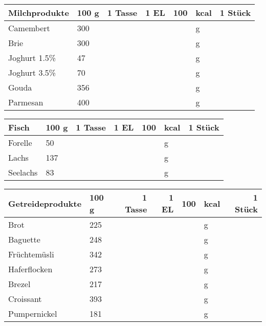 \vfill

\begin{tabularx}{\linewidth}{X|l|r|r|rl|r}
Milchprodukte     &   100 g & 1 Tasse & 1 EL &      100 & kcal    & 1 Stück  \\
\hline
Camembert         &     300 &         &      &          & g       &          \\
Brie              &     300 &         &      &          & g       &          \\
Joghurt 1.5\%     &      47 &         &      &          & g       &          \\
Joghurt 3.5\%     &      70 &         &      &          & g       &          \\
Gouda             &     356 &         &      &          & g       &          \\
Parmesan          &     400 &         &      &          & g       &          \\
\end{tabularx}

\newpage

\begin{tabularx}{\linewidth}{X|l|r|r|rl|r}
Fisch             &   100 g & 1 Tasse & 1 EL &      100 & kcal    & 1 Stück  \\
\hline
Forelle           &      50 &         &      &          & g       &          \\
Lachs             &     137 &         &      &          & g       &          \\
Seelachs          &      83 &         &      &          & g       &          \\
\end{tabularx}

\vfill

\begin{tabularx}{\linewidth}{X|l|r|r|rl|r}
Getreideprodukte  &   100 g & 1 Tasse & 1 EL &      100 & kcal    & 1 Stück  \\
\hline
Brot              &     225 &         &      &          & g       &          \\
Baguette          &     248 &         &      &          & g       &          \\
Früchtemüsli      &     342 &         &      &          & g       &          \\
Haferflocken      &     273 &         &      &          & g       &          \\
Brezel            &     217 &         &      &          & g       &          \\
Croissant         &     393 &         &      &          & g       &          \\
Pumpernickel      &     181 &         &      &          & g       &          \\
\end{tabularx}

